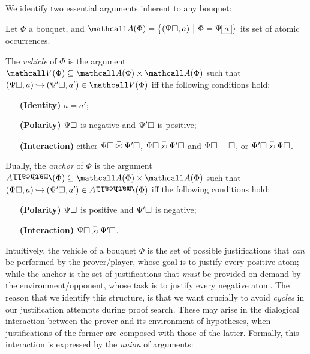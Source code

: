 We identify two essential arguments inherent to any bouquet:

\begin{definition} Let $\Phi$ a bouquet, and
  $\atomoccs{\Phi} = \compr{(\Psi\hole, a)}{\Phi = \Psi\select{a}}$ its set of
  atomic occurrences.
  
  The \emph{vehicle} of $\Phi$ is the argument $\vehicle{\Phi} \subseteq
  \atomoccs{\Phi} \times \atomoccs{\Phi}$ such that $(\Psi\hole, a) \justi
  (\Psi'\hole, a') \in \vehicle{\Phi}$ iff the following conditions hold:
  \begin{itemize}
    \item[\textbf{(Identity)}] $a = a'$;
    \item[\textbf{(Polarity)}] $\Psi\square$ is negative and $\Psi'\square$ is
    positive;
    \item[\textbf{(Interaction)}] either $\Psi\hole \cinterneg \Psi'\hole$,
    $\Psi\hole \sinterpos \Psi'\hole$ and $\Psi\square = \square$, or $\Psi'\hole
    \sinterpos \Psi\hole$.
  \end{itemize}

  Dually, the \emph{anchor} of $\Phi$ is the argument $\anchor{\Phi} \subseteq
  \atomoccs{\Phi} \times \atomoccs{\Phi}$ such that $(\Psi\hole, a) \justi
  (\Psi'\hole, a') \in \anchor{\Phi}$ iff the following conditions hold:
  \begin{itemize}
    \item[\textbf{(Polarity)}] $\Psi\square$ is positive and $\Psi'\square$ is
    negative;
    \item[\textbf{(Interaction)}] $\Psi\hole \sinterneg \Psi'\hole$.
  \end{itemize}
\end{definition}

Intuitively, the vehicle of a bouquet $\Phi$ is the set of possible
justifications that \emph{can} be performed by the prover/player, whose goal is
to justify every positive atom; while the anchor is the set of justifications
that \emph{must} be provided on demand by the environment/opponent, whose task
is to justify every negative atom. The reason that we identify this structure,
is that we want crucially to avoid \emph{cycles} in our justification attempts
during proof search. These may arise in the dialogical interaction between the
prover and its environment of hypotheses, when justifications of the former are
composed with those of the latter. Formally, this interaction is expressed by
the \emph{union} of arguments:

